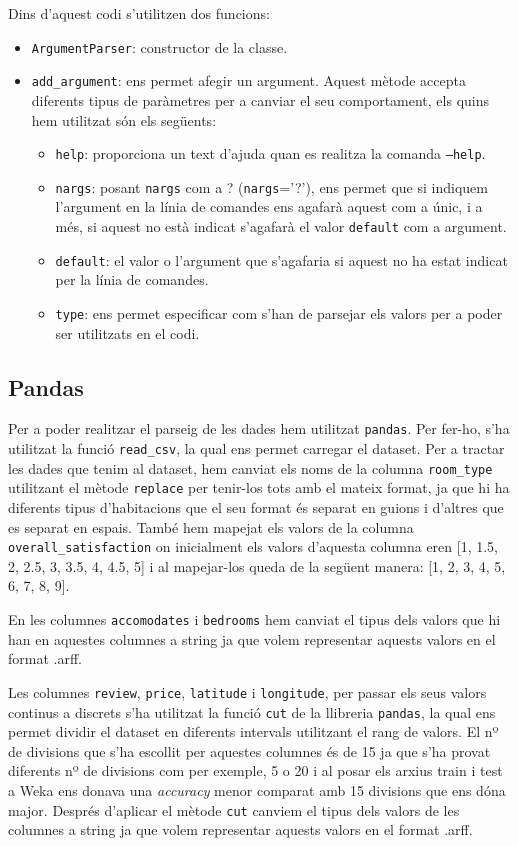 \documentclass[../informe.tex]{subfiles}
\begin{document}
    Dins d'aquest codi s'utilitzen dos funcions:
    \begin{itemize}
        \item \texttt{ArgumentParser}: constructor de la classe.
        \item \texttt{add\_argument}: ens permet afegir un argument. Aquest mètode accepta diferents tipus de paràmetres per a canviar el seu comportament, els quins hem utilitzat són els següents:
        \begin{itemize}
            \item \texttt{help}: proporciona un text d'ajuda quan es realitza la comanda \texttt{--help}.
            \item \texttt{nargs}: posant \texttt{nargs} com a ? (\texttt{nargs}='?'), ens permet que si indiquem l'argument en la línia de comandes ens agafarà aquest com a únic, i a més, si aquest no està indicat s'agafarà el valor \texttt{default} com a argument.
            \item \texttt{default}: el valor o l'argument que s'agafaria si aquest no ha estat indicat per la línia de comandes.
            \item \texttt{type}: ens permet especificar com s'han de parsejar els valors per a poder ser utilitzats en el codi.
        \end{itemize}
    \end{itemize}

    \subsection{Pandas}
    Per a poder realitzar el parseig de les dades hem utilitzat \texttt{pandas}. Per fer-ho, s'ha utilitzat la funció \texttt{read\_csv}, la qual ens permet carregar el dataset. Per a tractar les dades que tenim al dataset, hem canviat els noms de la columna \texttt{room\_type} utilitzant el mètode \texttt{replace} per tenir-los tots amb el mateix format, ja que hi ha diferents tipus d'habitacions que el seu format és separat en guions i d'altres que es separat en espais. També hem mapejat els valors de la columna \texttt{overall\_satisfaction} on inicialment els valors d'aquesta columna eren [1, 1.5, 2, 2.5, 3, 3.5, 4, 4.5, 5] i al mapejar-los queda de la següent manera: [1, 2, 3, 4, 5, 6, 7, 8, 9].

    \medskip
    En les columnes \texttt{accomodates} i \texttt{bedrooms} hem canviat el tipus dels valors que hi han en aquestes columnes a string ja que volem representar aquests valors en el format .arff.

    \medskip
    Les columnes \texttt{review}, \texttt{price}, \texttt{latitude} i \texttt{longitude}, per passar els seus valors continus a discrets s'ha utilitzat la funció \texttt{cut} de la llibreria \texttt{pandas}, la qual ens permet dividir el dataset en diferents intervals utilitzant el rang de valors. El nº de divisions que s'ha escollit per aquestes columnes és de 15 ja que s'ha provat diferents nº de divisions com per exemple, 5 o 20 i al posar els arxius train i test a Weka ens donava una \emph{accuracy} menor comparat amb 15 divisions que ens dóna major. Després d'aplicar el mètode \texttt{cut} canviem el tipus dels valors de les columnes a string ja que volem representar aquests valors en el format .arff.
\end{document}
